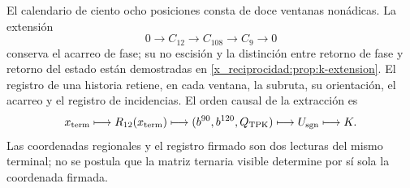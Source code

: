 El calendario de ciento ocho posiciones consta de doce ventanas nonádicas.
La extensión
\[
 0\longrightarrow C_{12}\longrightarrow C_{108}
 \longrightarrow C_9\longrightarrow0
\]
conserva el acarreo de fase; su no escisión y la distinción entre retorno de
fase y retorno del estado están demostradas en
\cref{x_reciprocidad:prop:k-extension}. El registro de una historia retiene, en cada
ventana, la subruta, su orientación, el acarreo y el registro de incidencias.
El orden causal de la extracción es
\begin{equation}
 x_{\rm term}\longmapsto\mathcal R_{12}(x_{\rm term})
 \longmapsto(b^{90},b^{120},Q_{\rm TPK})
 \longmapsto U_{\rm sgn}\longmapsto K.
 \label{x_reciprocidad:lib01:cadena-registro}
\end{equation}
Las coordenadas regionales y el registro firmado son dos lecturas del
mismo terminal; no se postula que la matriz ternaria visible determine por
sí sola la coordenada firmada.

